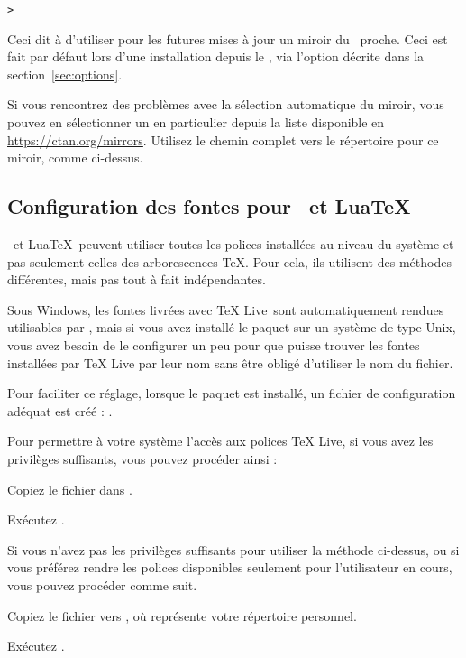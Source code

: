 \documentclass[german, english, french]{article}
\renewcommand{\TL}{\TeX{} Live\xspace}%
\begin{document}
\begin{alltt}
> 
\end{alltt}

Ceci dit à  d'utiliser pour les futures mises à jour un miroir du
\CTAN\ proche. Ceci est fait par défaut lors d'une installation depuis le \DVD,
via l'option décrite dans la section~\ref{sec:options}.

Si vous rencontrez des problèmes avec la sélection automatique du miroir, vous
pouvez en sélectionner un en particulier depuis la liste disponible en
\url{https://ctan.org/mirrors}. Utilisez le chemin complet vers le répertoire
 pour ce miroir, comme ci-dessus.


\subsection{Configuration des fontes pour \protect\XeTeX\ et Lua\protect\TeX}
\label{sec:font-conf-sys}

\XeTeX\ et Lua\TeX\ peuvent utiliser toutes les polices installées au niveau du
système et pas seulement celles des arborescences \TeX. Pour cela, ils utilisent
des méthodes différentes, mais pas tout à fait indépendantes.

Sous Windows, les fontes livrées avec \TL\ sont automatiquement rendues
utilisables par \XeTeX, mais si vous avez installé le paquet  sur
un système de type Unix, vous avez besoin de le configurer un peu pour que
\XeTeX{} puisse trouver les fontes installées par \TL{} par leur nom sans être
obligé d'utiliser le nom du fichier.

Pour faciliter ce réglage, lorsque le paquet  est installé, un
fichier de configuration adéquat est créé :
.

Pour permettre à votre système l'accès aux polices \TL, si vous avez les
privilèges suffisants, vous pouvez procéder ainsi :
\begin{enumerate*}
\item Copiez le fichier  dans
  .
\item Exécutez .
\end{enumerate*}

Si vous n'avez pas les privilèges suffisants pour utiliser la méthode ci-dessus,
ou si vous préférez rendre les polices disponibles seulement pour l'utilisateur
en cours, vous pouvez procéder comme suit.
\begin{enumerate*}
\item Copiez le fichier  vers
  , où \filename{~} représente votre répertoire
  personnel.
\item Exécutez .
\end{enumerate*}
\end{document}
